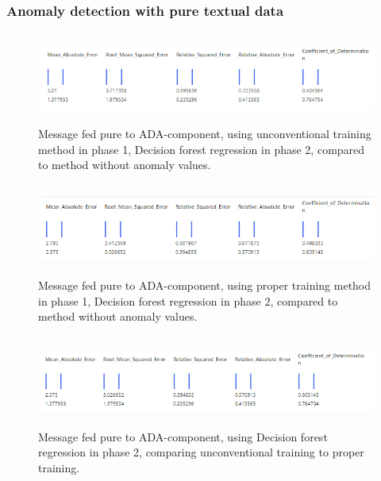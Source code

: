\clearpage

\subsubsection*{Anomaly detection with pure textual data}

\begin{figure}[htb]
    \centering
    \includegraphics[height=30mm,scale=0.5]{./appendices/msg_pure_decision-forest-reg_lewd2unanom.png}
    \caption{Message fed pure to ADA-component,
    using unconventional training method in phase 1,
        Decision forest regression in phase 2,
        compared to method without anomaly values.
        \label{fig:msg_pure_decision-forest-reg_lewd2unanom}}
\end{figure}

\begin{figure}[htb]
    \centering
    \includegraphics[height=30mm,scale=0.5]{./appendices/msg_pure_decision-forest-reg_proper2unanom.png}
    \caption{Message fed pure to ADA-component,
        using proper training method in phase 1,
        Decision forest regression in phase 2,
        compared to method without anomaly values.
        \label{fig:msg_pure_decision-forest-reg_proper2unanom}}
\end{figure}



\begin{figure}[htb]
    \centering
    \includegraphics[height=30mm,scale=0.5]{./appendices/msg_pure_decision-forest-reg_lewd2proper.png}
    \caption{Message fed pure to ADA-component,
    using Decision forest regression in phase 2,
        comparing unconventional training to proper training.
        \label{fig:msg_pure_decision-forest-reg_lewd2proper}}
\end{figure}

\clearpage